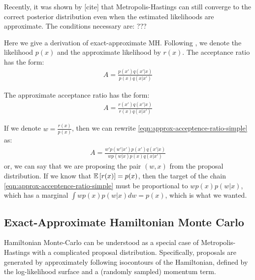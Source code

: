 \documentclass{article}
\begin{document}
Recently, it was shown by [cite] that Metropolis-Hastings can still converge to the correct posterior distribution even when the estimated likelihoods are approximate.  The conditions necessary are: ???

Here we give a derivation of exact-approximate MH.  Following \cite{eamcblogWilk10}, we denote the likelihood $p(x)$ and the approximate likelihood by $r(x)$.
%
The acceptance ratio has the form:
%
\begin{align}
A = \frac{p(x') q(x' | x )}{p(x) q(x | x' )}
\end{align}

The approximate acceptance ratio has the form:
%
\begin{align}
A = \frac{r(x') q(x' | x )}{r(x) q(x | x' )}
\label{eqn:approx-acceptence-ratio-simple}
\end{align}

If we denote $w = \frac{r(x)}{p(x)}$, then we can rewrite \eqref{eqn:approx-acceptence-ratio-simple} as:
%
\begin{align}
A = \frac{w' p(w' | x' ) p(x') q(x' | x )}{w p(w | x ) p(x) q(x | x' )}
\label{eqn:approx-acceptence-ratio-complex}
\end{align}
%
or, we can say that we are proposing the pair $(w,x)$ from the proposal distribution.
%
%
If we know that $\mathbb{E}\left[ r(x) \right] = p(x)$, then the target of the chain \eqref{eqn:approx-acceptence-ratio-simple} must be proportional to $w p(x) p(w|x)$, which has a marginal $ \int w p(x) p(w|x) dw = p(x)$, which is what we wanted.

\subsection{Exact-Approximate Hamiltonian Monte Carlo}

Hamiltonian Monte-Carlo can be understood as a special case of Metropolis-Hastings with a complicated proposal distribution.  Specifically, proposals are generated by approximately following isocontours of the Hamiltonian, defined by the log-likelihood surface and a (randomly sampled) momentum term.

\end{document}
